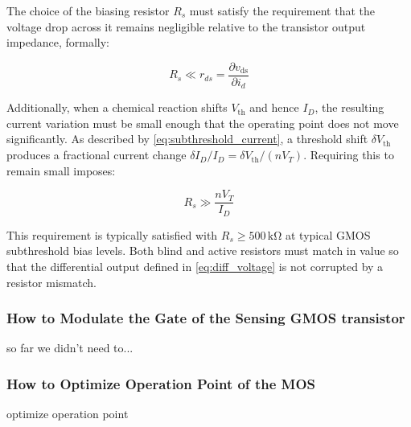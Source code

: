 The choice of the biasing resistor $R_s$ must satisfy the requirement that
the voltage drop across it remains negligible relative to the transistor output
impedance, formally:

\begin{equation}
  R_s \ll r_{ds} = \frac{\partial v_{\mathrm{ds}}}{\partial i_d}
  \label{eq:bias_condition}
\end{equation}

Additionally, when a chemical reaction shifts $V_{\mathrm{th}}$ and hence $I_D$,
the resulting current variation must be small enough that the operating point
does not move significantly. As described by \eqref{eq:subthreshold_current},
a threshold shift $\delta V_{\mathrm{th}}$ produces a fractional current change
$\delta I_D / I_D = \delta V_{\mathrm{th}} / (nV_T)$. Requiring this to remain
small imposes:

\begin{equation}
  R_s \gg \frac{nV_T}{I_D}
  \label{eq:Rs_condition}
\end{equation}

This requirement is typically satisfied with $R_s \geq 500\,\mathrm{k\Omega}$ at
typical GMOS subthreshold bias levels. Both blind and active resistors must
match in value so that the differential output defined in \eqref{eq:diff_voltage}
is not corrupted by a resistor mismatch.

\subsubsection{How to Modulate the Gate of the Sensing GMOS transistor}
so far we didn't need to...

\subsubsection{How to Optimize Operation Point of the MOS}
optimize operation point
